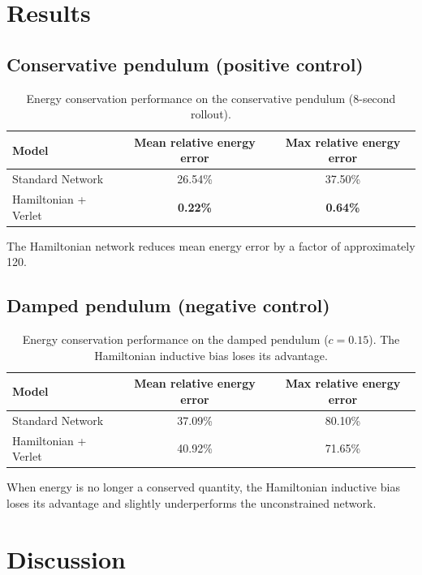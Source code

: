 \documentclass[11pt,a4paper]{article}
\begin{document}
\section{Results}

\subsection{Conservative pendulum (positive control)}

\begin{table}[h]
\centering
\begin{tabular}{lcc}
\toprule
Model & Mean relative energy error & Max relative energy error \\
\midrule
Standard Network           & 26.54\% & 37.50\% \\
Hamiltonian + Verlet       & \textbf{0.22\%} & \textbf{0.64\%} \\
\bottomrule
\end{tabular}
\caption{Energy conservation performance on the conservative pendulum (8-second rollout).}
\label{tab:cons}
\end{table}

The Hamiltonian network reduces mean energy error by a factor of approximately 120.

\subsection{Damped pendulum (negative control)}

\begin{table}[h]
\centering
\begin{tabular}{lcc}
\toprule
Model & Mean relative energy error & Max relative energy error \\
\midrule
Standard Network           & 37.09\% & 80.10\% \\
Hamiltonian + Verlet       & 40.92\% & 71.65\% \\
\bottomrule
\end{tabular}
\caption{Energy conservation performance on the damped pendulum (\(c=0.15\)). The Hamiltonian inductive bias loses its advantage.}
\label{tab:damped}
\end{table}

When energy is no longer a conserved quantity, the Hamiltonian inductive bias loses its advantage and slightly underperforms the unconstrained network.

\section{Discussion}
\end{document}
